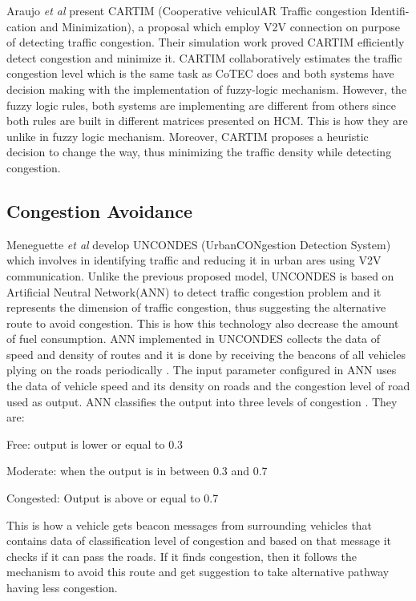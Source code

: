 \documentclass[conference]{IEEEtran}
\begin{document}
Araujo \textit{et al} \cite{milazzo1999quality} present CARTIM (Cooperative vehiculAR Traffic congestion Identifi-
cation and Minimization), a proposal which employ V2V connection on purpose of detecting traffic congestion. Their simulation work proved CARTIM efficiently detect congestion and minimize it. CARTIM collaboratively estimates the traffic congestion level which is the same task as CoTEC does and both systems have decision making with the implementation of fuzzy-logic mechanism. However, the fuzzy logic rules, both systems are implementing are different from others since both rules are built in different matrices presented on HCM. This is how they are unlike in fuzzy logic mechanism. Moreover, CARTIM proposes a heuristic decision to change the way, thus minimizing the traffic density while detecting congestion. 




\subsection{Congestion Avoidance}
Meneguette \textit{et al} \cite{meneguetteenhancing} develop UNCONDES (UrbanCONgestion Detection System) which involves in identifying traffic and reducing it in urban ares using V2V communication. Unlike the previous proposed model, UNCONDES is based on Artificial Neutral Network(ANN) to detect traffic congestion problem and it represents the dimension of traffic congestion, thus suggesting the  alternative route to avoid congestion. This is how this technology also decrease the amount of fuel consumption. ANN implemented in UNCONDES collects the data of speed and density of routes and it is done by receiving the beacons of all vehicles plying on the roads periodically \cite{yousefi2006vehicular}. The input parameter configured in ANN uses the data of vehicle speed and its density on roads and the congestion level of road used as output. ANN classifies the output into three levels of congestion \cite{meneguetteenhancing}. They are: 

Free: output is lower or equal to 0.3

Moderate: when the output is in between 0.3 and 0.7

Congested: Output is above or equal to 0.7


This is how a vehicle gets beacon messages from surrounding vehicles that contains data of classification level of congestion and based on that message it checks if it can pass the roads. If it finds congestion, then it follows the mechanism to avoid this route and get suggestion to take alternative pathway having less congestion.
\end{document}
